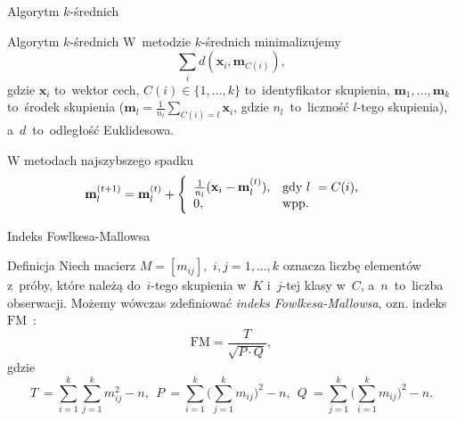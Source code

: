 \documentclass[11pt,pdftex,mathserif]{beamer}
\theoremstyle{definition}
\begin{document}
\begin{frame}{Algorytm $k$-średnich}
\begin{block}{Algorytm $k$-średnich}
W~metodzie $k$-średnich minimalizujemy
$$
\sum_i d(\mathbf{x}_i, \mathbf{m}_{C(i)}),
$$
gdzie $\mathbf{x}_i$ to~wektor cech, $C(i) \in \{1,\ldots,k\}$ to~identyfikator skupienia, $\mathbf{m}_1,\ldots,\mathbf{m}_k$ to~środek skupienia ($\mathbf{m}_l = \frac{1}{n_l} \sum\limits_{C(i) = l} \mathbf{x}_i$, gdzie $n_l$~to~liczność $l$-tego skupienia), a~$d$~to~odległość Euklidesowa.
\end{block}
\pause
W metodach najszybszego spadku~\cite{Bottou1995:convergenceproperties}
\begin{align}
\mathbf{m}_l^{(t+1)}& = \mathbf{m}_l^{(t)} + \left\{
\begin{array}{l l}     
    \frac{1}{n_l}(\mathbf{x}_i - \mathbf{m}^{(t)}_l), & \text{gdy } l~= C(i), \\
    0, & \text{wpp.}
\end{array}\right.
\end{align}
\end{frame}

\begin{frame}{Indeks Fowlkesa-Mallowsa}
\begin{block}{Definicja}
Niech macierz $M = [m_{ij}],$ $i,j = 1,\ldots, k$ oznacza liczbę elementów z~próby, które należą do~$i$-tego skupienia w~$K$ i~$j$-tej klasy w~$C$, a~$n$~to~liczba obserwacji. Możemy wówczas zdefiniować \emph{indeks Fowlkesa-Mallowsa}, ozn. indeks $\mathrm{FM}$~\cite{Fowlkes1983:fmindex}:
$$
\mathrm{FM} = \frac{T}{\sqrt{P\cdot Q}},
$$
gdzie 
$$
T~= \sum\limits_{i=1}^{k}\sum\limits_{j=1}^{k} m_{ij}^2 - n,\ \ 
P~= \sum\limits_{i=1}^{k} \bigg(\sum\limits_{j=1}^{k} m_{ij}\bigg)^2 - n,\ \ 
Q~= \sum\limits_{j=1}^{k} \bigg(\sum\limits_{i=1}^{k} m_{ij}\bigg)^2 - n.
$$
\end{block}
\end{frame}
\end{document}

